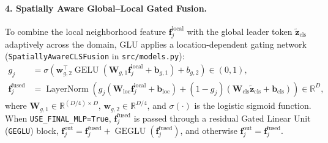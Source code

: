 \paragraph{4. Spatially Aware Global--Local Gated Fusion.}
To combine the local neighborhood feature $\mathbf{f}_j^{\text{local}}$ with the global leader token $\tilde{\mathbf{z}}_{\text{cls}}$ adaptively across the domain, GLU applies a location-dependent gating network (\texttt{SpatiallyAwareCLSFusion} in \texttt{src/models.py}):
\begin{align}
    g_j &= \sigma\!\left(\mathbf{w}_{g,2}^\top \operatorname{GELU}\!\left(\mathbf{W}_{g,1} \mathbf{f}_j^{\text{local}} + \mathbf{b}_{g,1}\right) + b_{g,2}\right) \in (0, 1), \label{eq:bg_glu_gate} \\
    \mathbf{f}_j^{\text{fused}} &= \operatorname{LayerNorm}\!\left(g_j \left(\mathbf{W}_{\text{loc}} \mathbf{f}_j^{\text{local}} + \mathbf{b}_{\text{loc}}\right) + (1 - g_j)\left(\mathbf{W}_{\text{cls}} \tilde{\mathbf{z}}_{\text{cls}} + \mathbf{b}_{\text{cls}}\right)\right) \in \mathbb{R}^D, \label{eq:bg_glu_cls_fusion}
\end{align}
where $\mathbf{W}_{g,1} \in \mathbb{R}^{(D/4) \times D}$, $\mathbf{w}_{g,2} \in \mathbb{R}^{D/4}$, and $\sigma(\cdot)$ is the logistic sigmoid function. When \texttt{USE\_FINAL\_MLP=True}, $\mathbf{f}_j^{\text{fused}}$ is passed through a residual Gated Linear Unit (\texttt{GEGLU}) block, $\mathbf{f}_j^{\text{out}} = \mathbf{f}_j^{\text{fused}} + \operatorname{GEGLU}(\mathbf{f}_j^{\text{fused}})$, and otherwise $\mathbf{f}_j^{\text{out}} = \mathbf{f}_j^{\text{fused}}$.


